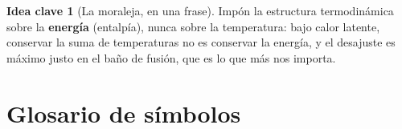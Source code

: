 \documentclass[11pt]{article}
\theoremstyle{definition}
\newtheorem{idea}{Idea clave}[section]
\theoremstyle{plain}
\begin{document}
\begin{idea}[La moraleja, en una frase]
Impón la estructura termodinámica sobre la \textbf{energía} (entalpía), nunca sobre
la temperatura: bajo calor latente, conservar la suma de temperaturas no es
conservar la energía, y el desajuste es máximo justo en el baño de fusión, que es
lo que más nos importa.
\end{idea}

\appendix
\section{Glosario de símbolos}

\renewcommand{\arraystretch}{1.25}
\noindent
\end{document}
